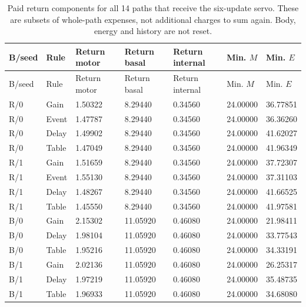 \begin{longtable}{lllllll}
\caption{Paid return components for all 14 paths that receive the six-update servo. These are subsets of whole-path expenses, not additional charges to sum again. Body, energy and history are not reset.}\label{tab:local-history-return-costs}\\
\toprule
B/seed & Rule & Return motor & Return basal & Return internal & Min. $M$ & Min. $E$ \\
\midrule
\endfirsthead
\toprule
B/seed & Rule & Return motor & Return basal & Return internal & Min. $M$ & Min. $E$ \\
\midrule
\endhead
R/0 & Gain & 1.50322 & 8.29440 & 0.34560 & 24.00000 & 36.77851 \\
R/0 & Event & 1.47787 & 8.29440 & 0.34560 & 24.00000 & 36.36260 \\
R/0 & Delay & 1.49902 & 8.29440 & 0.34560 & 24.00000 & 41.62027 \\
R/0 & Table & 1.47049 & 8.29440 & 0.34560 & 24.00000 & 41.96349 \\
R/1 & Gain & 1.51659 & 8.29440 & 0.34560 & 24.00000 & 37.72307 \\
R/1 & Event & 1.55130 & 8.29440 & 0.34560 & 24.00000 & 37.31103 \\
R/1 & Delay & 1.48267 & 8.29440 & 0.34560 & 24.00000 & 41.66525 \\
R/1 & Table & 1.45550 & 8.29440 & 0.34560 & 24.00000 & 41.97581 \\
B/0 & Gain & 2.15302 & 11.05920 & 0.46080 & 24.00000 & 21.98411 \\
B/0 & Delay & 1.98104 & 11.05920 & 0.46080 & 24.00000 & 33.77543 \\
B/0 & Table & 1.95216 & 11.05920 & 0.46080 & 24.00000 & 34.33191 \\
B/1 & Gain & 2.02136 & 11.05920 & 0.46080 & 24.00000 & 26.25317 \\
B/1 & Delay & 1.97219 & 11.05920 & 0.46080 & 24.00000 & 35.48735 \\
B/1 & Table & 1.96933 & 11.05920 & 0.46080 & 24.00000 & 34.68080 \\
\bottomrule
\end{longtable}
